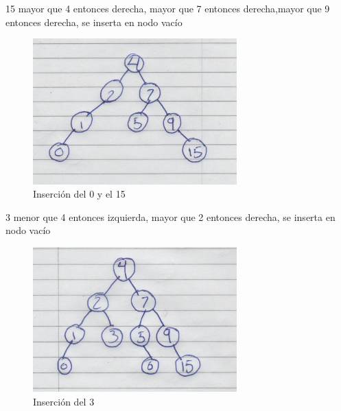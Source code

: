 15 mayor que 4 entonces derecha, mayor que 7 entonces derecha,mayor que 9 entonces derecha, se inserta en nodo vacío
\begin{figure}[H]
	\centering
	\includegraphics[width=0.7\textwidth]{./images/imagen8.jpg}
	\caption{Inserción del 0 y el 15}
\end{figure}
3 menor que 4 entonces izquierda, mayor que 2 entonces derecha, se inserta en nodo vacío
\begin{figure}[H]
	\centering
	\includegraphics[width=0.7\textwidth]{./images/imagen9.jpg}
	\caption{Inserción del 3}
\end{figure} 
